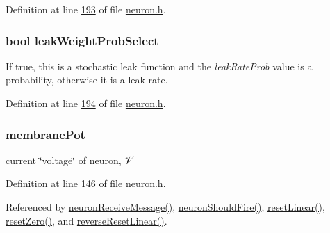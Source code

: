 Definition at line \hyperlink{neuron_8h_source_l00193}{193} of file \hyperlink{neuron_8h_source}{neuron.\+h}.

\hypertarget{structneuron_state_a20889d9b55895bcc719d6aad2766b8f8}{}
\subsubsection[{leak\+Weight\+Prob\+Select}]{\setlength{\rightskip}{0pt plus 5cm}bool leak\+Weight\+Prob\+Select}\label{structneuron_state_a20889d9b55895bcc719d6aad2766b8f8}


If true, this is a stochastic leak function and the {\itshape leak\+Rate\+Prob} value is a probability, otherwise it is a leak rate. 



Definition at line \hyperlink{neuron_8h_source_l00194}{194} of file \hyperlink{neuron_8h_source}{neuron.\+h}.

\hypertarget{structneuron_state_a0fdd8f44c4105a94e17c4c58a51db486}{}
\subsubsection[{membrane\+Pot}]{ membrane\+Pot}\label{structneuron_state_a0fdd8f44c4105a94e17c4c58a51db486}


current \char`\"{}voltage\char`\"{} of neuron, 𝒱 



Definition at line \hyperlink{neuron_8h_source_l00146}{146} of file \hyperlink{neuron_8h_source}{neuron.\+h}.



Referenced by \hyperlink{neuron_8c_source_l00104}{neuron\+Receive\+Message()}, \hyperlink{neuron_8c_source_l00157}{neuron\+Should\+Fire()}, \hyperlink{neuron_8c_source_l00067}{reset\+Linear()}, \hyperlink{neuron_8c_source_l00056}{reset\+Zero()}, and \hyperlink{neuron_8c_source_l00075}{reverse\+Reset\+Linear()}.

\hypertarget{structneuron_state_a76ef99e5766b6e36c3f41a2920e8c56c}{}

